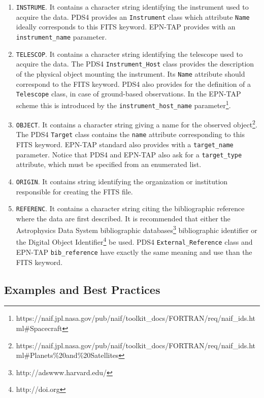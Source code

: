 \begin{enumerate}
\item{\texttt{INSTRUME}.
It contains a character string identifying the instrument used to acquire the data.
PDS4 provides an \texttt{Instrument} class which attribute \texttt{Name} ideally 
corresponds to this FITS keyword.
EPN-TAP provides with an \texttt{instrument\_name} parameter.}

\item{\texttt{TELESCOP}.
It contains a character string identifying the telescope used to acquire the data.
The PDS4 \texttt{Instrument\_Host} class provides the description of the physical object
mounting the instrument.
Its \texttt{Name} attribute should correspond to the FITS keyword.
PDS4 also provides for the definition of a \texttt{Telescope} class, in case of
ground-based observations.
In the EPN-TAP scheme this is introduced by the \texttt{instrument\_host\_name}
parameter\footnote{https://naif.jpl.nasa.gov/pub/naif/toolkit\_docs/FORTRAN/req/naif\_ids.html\#Spacecraft}.}

\item{\texttt{OBJECT}.
It contains a character string giving a name for the observed
object\footnote{https://naif.jpl.nasa.gov/pub/naif/toolkit\_docs/FORTRAN/req/naif\_ids.html\#Planets\%20and\%20Satellites}.
The PDS4 \texttt{Target} class contains the \texttt{name} attribute corresponding to
this FITS keyword.
EPN-TAP standard also provides with a \texttt{target\_name} parameter.
Notice that PDS4 and EPN-TAP also ask for a \texttt{target\_type} attribute,
which must be specified from an enumerated list.}

\item{\texttt{ORIGIN}.
It contains string identifying the organization or institution responsible for
creating the FITS file.}

%

\item{\texttt{REFERENC}.
It contains a character string citing the bibliographic reference where the
data are first described.
It is recommended that either the Astrophysics Data System bibliographic
databases\footnote{http://adswww.harvard.edu/}
bibliographic identifier or the Digital Object Identifier\footnote{http://doi.org}
be used.
PDS4 \texttt{External\_Reference} class and EPN-TAP \texttt{bib\_reference} have
exactly the same meaning and use than the FITS keyword.}

\end{enumerate}

\subsection{Examples and Best Practices}

